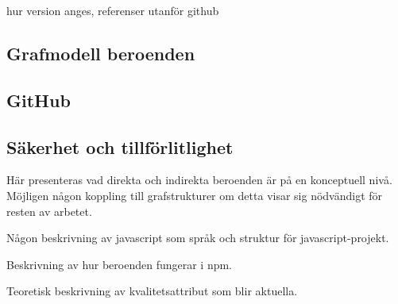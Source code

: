 hur version anges, referenser utanför github

\subsection{Grafmodell beroenden}

\subsection{GitHub}

\subsection{Säkerhet och tillförlitlighet}

Här presenteras vad direkta och indirekta beroenden är på en konceptuell nivå. Möjligen någon koppling till grafstrukturer om detta visar sig nödvändigt för resten av arbetet.

Någon beskrivning av javascript som språk och struktur för javascript-projekt.

Beskrivning av hur beroenden fungerar i npm.

Teoretisk beskrivning av kvalitetsattribut som blir aktuella.
